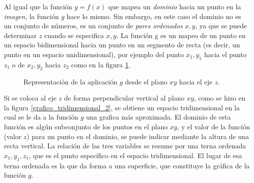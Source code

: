 Al igual que la función \(y=f(x)\) que mapea un \textit{dominio} hacia un punto en la \textit{imagen}, la función \(g\) hace lo mismo. Sin embargo, en este caso el dominio no es un conjunto de números, es un conjunto de \textit{pares ordenados} \(x,y\), ya que se puede determinar \(z\) cuando se especifica \(x,y\).
La función g es un mapeo de un punto en un espacio bidimensional hacia un punto en un segmento de recta (es decir, un punto en un espacio unidimensional), por ejemplo del punto \(x_1, y_1\) hacia el punto \(z_1\) o de \(x_2, y_2\) hacia \(z_2\) como en la figura \ref{grafico_tidimensional_1}.

\begin{figure}[htbp]
    \centering
    \caption{Representación de la aplicación $g$ desde el plano $xy$ hacia el eje $z$.}
    \label{grafico_tidimensional_1}
\end{figure}

Si se coloca al eje \(z\) de forma perpendicular vertical al plano \(xy\), como se hizo en la figura \ref{grafico_tridimensional_2}, se obtiene un espacio tridimensional en la cual se le da a la función \(g\) una grafica más aproximada.
El dominio de esta función es algún subconjunto de los puntos en el plano \(xy\), y el valor de la función (valor \(z\)) para un punto en el dominio, se puede indicar mediante la altura de una recta vertical.
La relación de las tres variables se resume por una terna ordenada \(x_1,y_1,z_1\), que es el punto específico en el espacio tridimensional.
El lugar de esa terna ordenada es la que da forma a una superficie, que constituye la gráfica de la función \(g\).

